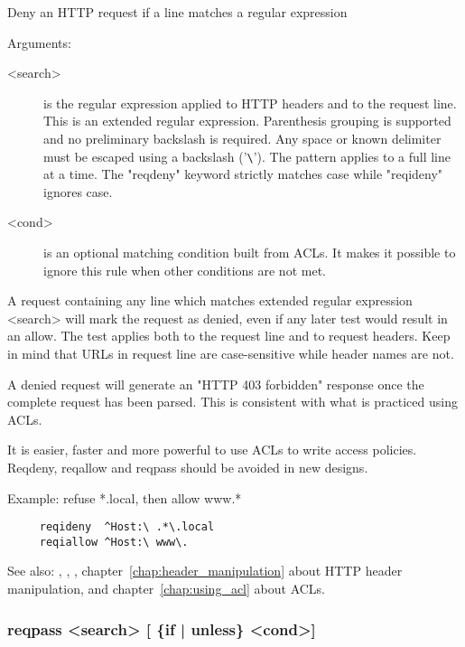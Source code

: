 {

  Deny an HTTP request if a line matches a regular expression


  Arguments:
\begin{description}
\item[<search>]  is the regular expression applied to HTTP headers and to the
              request line. This is an extended regular expression. Parenthesis
              grouping is supported and no preliminary backslash is required.
              Any space or known delimiter must be escaped using a backslash
              ('\verb|\|'). The pattern applies to a full line at a time. The
              "reqdeny" keyword strictly matches case while "reqideny" ignores
              case.

\item[<cond>] is an optional matching condition built from ACLs. It makes it
              possible to ignore this rule when other conditions are not met.
\end{description}

  A request containing any line which matches extended regular expression
  <search> will mark the request as denied, even if any later test would
  result in an allow. The test applies both to the request line and to request
  headers. Keep in mind that URLs in request line are case-sensitive while
  header names are not.

  A denied request will generate an "HTTP 403 forbidden" response once the
  complete request has been parsed. This is consistent with what is practiced
  using ACLs.

  It is easier, faster and more powerful to use ACLs to write access policies.
  Reqdeny, reqallow and reqpass should be avoided in new designs.

  Example: refuse *.local, then allow www.*
  
\begin{verbatim}
     reqideny  ^Host:\ .*\.local
     reqiallow ^Host:\ www\.
\end{verbatim}

  See also: , , , chapter~\ref{chap:header_manipulation} about HTTP header
            manipulation, and chapter~\ref{chap:using_acl} about ACLs.

\subsubsection[reqpass]{reqpass  <search> [ \{if | unless\} <cond>] }
}
